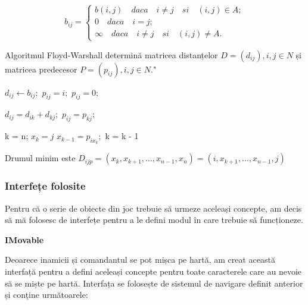 \documentclass[12pt, a4paper]{article}
\begin{document}
	\begin{equation*}
		b_{ij} = \begin{cases}
			b(i, j) \quad daca \quad i \neq j \quad si \quad (i, j) \in A; \\
			0 \quad daca \quad i = j; \\
			\infty \quad daca \quad i \neq j \quad si \quad (i, j) \neq A.
		\end{cases}
	\end{equation*}

	Algoritmul Floyd-Warshall determină matricea distanțelor $D = (d_{ij}), i, j \in N$ și matricea predecesor $P = (p_{ij}), i, j \in N$." \cite{grafuriAnul2}
	
	\begin{algorithmic}
					\State $d_{ij} \gets b_{ij};$
						\State $p_{ij} = i;$
					\Else
						\State $p_{ij} = 0;$
					\EndIf
				\EndFor
			\EndFor
			
							\State $d_{ij} = d_{ik} + d_{kj};$
							\State $p_{ij} = p_{kj};$
						\EndIf
					\EndFor
				\EndFor
			\EndFor
		\EndFunction
	\end{algorithmic}

	\begin{algorithmic}
		\Function{Reconstruire Drum}{}
			\State k = n;
			\State $x_k = j$
			\While{$x_k \neq i$}
				\State $x_{k - 1} = p_{ix_k};$
				\State k = k - 1
			\EndWhile
		\EndFunction
	\end{algorithmic}

	Drumul minim este $D_{ijp} = (x_k, x_{k+1}, \dots, x_{n-1}, x_n) = (i, x_{k+1}, \dots, x_{n-1}, j)$
	
	
	
	
	
	\subsubsection{Interfețe folosite}
	
	Pentru că o serie de obiecte din joc trebuie să urmeze aceleași concepte, am decis să mă folosesc de interfețe pentru a le defini modul în care trebuie să funcționeze. 
	\newline
	
	\textbf{IMovable}
	
	Deoarece inamicii și comandantul se pot mișca pe hartă, am creat această interfață pentru a defini aceleași concepte pentru toate caracterele care au nevoie să se miște pe hartă. Interfața se folosește de sistemul de navigare definit anterior și conține următoarele:
	
\end{document}
